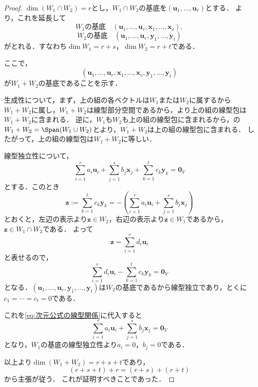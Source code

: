 \begin{leftbar}
\begin{proof}
  $\dim(W_1 \cap W_2) = r$とし，$W_1 \cap W_2$の基底を$(\bm{u}_1, \dots, \bm{u}_r)$とする．
  より，これを延長して
  \[
    W_1 \text{の基底} \quad (\bm{u}_1, \dots, \bm{u}_r, \bm{x}_1, \dots, \bm{x}_s),
  \]
  \[
    W_2 \text{の基底} \quad (\bm{u}_1, \dots, \bm{u}_r, \bm{y}_1, \dots, \bm{y}_t)
  \]
  がとれる．すなわち$\dim W_1 = r + s$，$\dim W_2 = r + t$である．

  ここで，
  \[
    (\bm{u}_1, \dots, \bm{u}_r, \bm{x}_1, \dots, \bm{x}_s, \bm{y}_1, \dots, \bm{y}_t)
  \]
  が$W_1 + W_2$の基底であることを示す．

  生成性について，まず，上の組の各ベクトルは$W_1$または$W_2$に属するから$W_1 + W_2$に属し，$W_1 + W_2$は線型部分空間であるから，より上の組の線型包は$W_1 + W_2$に含まれる．
  逆に，$W_1$も$W_2$も上の組の線型包に含まれるから，の$W_1 + W_2 = \Span(W_1 \cup W_2)$とより，$W_1 + W_2$は上の組の線型包に含まれる．
  したがって，上の組の線型包は$W_1 + W_2$に等しい．

  線型独立性について，
  \begin{equation}
    \sum_{i=1}^{r} a_i \bm{u}_i + \sum_{j=1}^{s} b_j \bm{x}_j + \sum_{k=1}^{t} c_k \bm{y}_k = \bm{0}_V
    \label{eq:次元公式の線型関係}
  \end{equation}
  とする．このとき
  \[
    \bm{z} := \sum_{k=1}^{t} c_k \bm{y}_k
    = -\left( \sum_{i=1}^{r} a_i \bm{u}_i + \sum_{j=1}^{s} b_j \bm{x}_j \right)
  \]
  とおくと，左辺の表示より$\bm{z} \in W_2$，右辺の表示より$\bm{z} \in W_1$であるから，$\bm{z} \in W_1 \cap W_2$である．
  よって
  \[
    \bm{z} = \sum_{i=1}^{r} d_i \bm{u}_i
  \]
  と表せるので，
  \[
    \sum_{i=1}^{r} d_i \bm{u}_i - \sum_{k=1}^{t} c_k \bm{y}_k = \bm{0}_V
  \]
  となる．$(\bm{u}_1, \dots, \bm{u}_r, \bm{y}_1, \dots, \bm{y}_t)$は$W_2$の基底であるから線型独立であり，とくに$c_1 = \cdots = c_t = 0$である．

  これを\eqref{eq:次元公式の線型関係}に代入すると
  \[
    \sum_{i=1}^{r} a_i \bm{u}_i + \sum_{j=1}^{s} b_j \bm{x}_j = \bm{0}_V
  \]
  となり，$W_1$の基底の線型独立性より$a_i = 0$，$b_j = 0$である．

  以上より$\dim(W_1 + W_2) = r + s + t$であり，
  \[
    (r + s + t) + r = (r + s) + (r + t)
  \]
  から主張が従う．
  これが証明すべきことであった．
\end{proof}
\end{leftbar}

